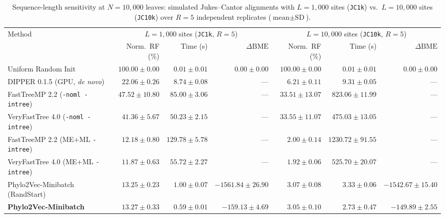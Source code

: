 \begin{table}[!htbp]
\centering
\caption{Sequence-length sensitivity at $N=10{,}000$ leaves: simulated Jukes--Cantor alignments with $L=1{,}000$ sites (\texttt{JC1k}) vs.\ $L=10{,}000$ sites (\texttt{JC10k}) over $R=5$ independent replicates ($\text{mean}\pm\text{SD}$).}
\label{tab:jc1k_scaling}
\scriptsize
\setlength{\tabcolsep}{3.5pt}
\begin{tabular*}{\linewidth}{@{\extracolsep{\fill}}lrrrrrr@{}}
\toprule
Method & \multicolumn{3}{c}{$L=1{,}000$ sites (\texttt{JC1k}, $R=5$)} & \multicolumn{3}{c}{$L=10{,}000$ sites (\texttt{JC10k}, $R=5$)}\\
\cmidrule(lr){2-4}\cmidrule(lr){5-7}
 & Norm.\ RF (\%) & Time (s) & $\Delta\text{BME}$ & Norm.\ RF (\%) & Time (s) & $\Delta\text{BME}$\\
\midrule
Uniform Random Init & $100.00 \pm 0.00$ & $0.01 \pm 0.01$ & $0.00 \pm 0.00$ & $100.00 \pm 0.00$ & $0.01 \pm 0.01$ & $0.00 \pm 0.00$\\
DIPPER 0.1.5 (GPU, \textit{de novo}) & $22.06 \pm 0.26$ & $8.74 \pm 0.08$ & --- & $6.21 \pm 0.11$ & $9.31 \pm 0.05$ & ---\\
FastTreeMP 2.2 (\texttt{-noml -intree}) & $47.52 \pm 10.80$ & $85.00 \pm 3.06$ & --- & $33.51 \pm 13.07$ & $823.06 \pm 11.99$ & ---\\
VeryFastTree 4.0 (\texttt{-noml -intree}) & $41.36 \pm 5.67$ & $50.23 \pm 2.15$ & --- & $33.55 \pm 11.07$ & $475.03 \pm 13.05$ & ---\\
FastTreeMP 2.2 (ME+ML \texttt{-intree}) & $12.18 \pm 0.80$ & $129.78 \pm 5.78$ & --- & $2.00 \pm 0.14$ & $1230.72 \pm 91.55$ & ---\\
VeryFastTree 4.0 (ME+ML \texttt{-intree}) & $\mathbf{11.87 \pm 0.63}$ & $55.72 \pm 2.27$ & --- & $\mathbf{1.92 \pm 0.06}$ & $525.70 \pm 20.07$ & ---\\
Phylo2Vec-Minibatch (RandStart) & $13.25 \pm 0.23$ & $1.00 \pm 0.07$ & $-1561.84 \pm 26.90$ & $3.07 \pm 0.08$ & $3.33 \pm 0.06$ & $-1542.67 \pm 15.40$\\
\textbf{Phylo2Vec-Minibatch} & $13.27 \pm 0.33$ & $\mathbf{0.59 \pm 0.01}$ & $-159.13 \pm 4.69$ & $3.05 \pm 0.10$ & $\mathbf{2.73 \pm 0.47}$ & $-149.89 \pm 2.55$\\
\bottomrule
\end{tabular*}
\end{table}

